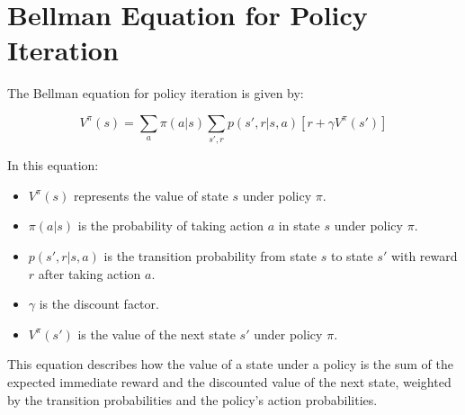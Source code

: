 \documentclass{article}
\begin{document}
\section*{Bellman Equation for Policy Iteration}

The Bellman equation for policy iteration is given by:

\begin{equation}
V^{\pi}(s) = \sum_{a} \pi(a|s) \sum_{s', r} p(s', r|s, a)[r + \gamma V^{\pi}(s')]
\end{equation}

In this equation:
\begin{itemize}
    \item \( V^{\pi}(s) \) represents the value of state \( s \) under policy \( \pi \).
    \item \( \pi(a|s) \) is the probability of taking action \( a \) in state \( s \) under policy \( \pi \).
    \item \( p(s', r|s, a) \) is the transition probability from state \( s \) to state \( s' \) with reward \( r \) after taking action \( a \).
    \item \( \gamma \) is the discount factor.
    \item \( V^{\pi}(s') \) is the value of the next state \( s' \) under policy \( \pi \).
\end{itemize}

This equation describes how the value of a state under a policy is the sum of the expected immediate reward and the discounted value of the next state, weighted by the transition probabilities and the policy's action probabilities.
\end{document}

